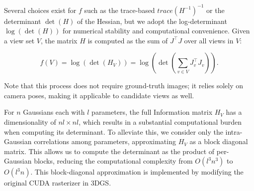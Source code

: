


Several choices exist for $f$ such as the trace-based $trace(H^{-1})^{-1}$ or the determinant $\det(H)$ of the Hessian, but we adopt the log-determinant $\log(\det(H))$ for numerical stability and computational convenience. Given a view set $V$, the matrix $H$ is computed as the sum of $J^\top J$ over all views in $V$:

{\small
\begin{equation}
f(V) = \log(\det(H_V)) = \log( \det(\sum_{v \in V}J_v^\top J_v)).
\end{equation}
}

Note that this process does not require ground-truth images; it relies solely on camera poses, making it applicable to candidate views as well.


For $n$ Gaussians each with $l$ parameters, the full Information matrix $H_V$ has a dimensionality of $nl \times nl$, which results in a substantial computational burden when computing its determinant. To alleviate this, we consider only the intra-Gaussian correlations among parameters, approximating $H_V$ as a block diagonal matrix. This allows us to compute the determinant as the product of per-Gaussian blocks, reducing the computational complexity from $O(l^3n^3)$ to $O(l^3n)$. This block-diagonal approximation is implemented by modifying the original CUDA rasterizer in \ac{3DGS}.

